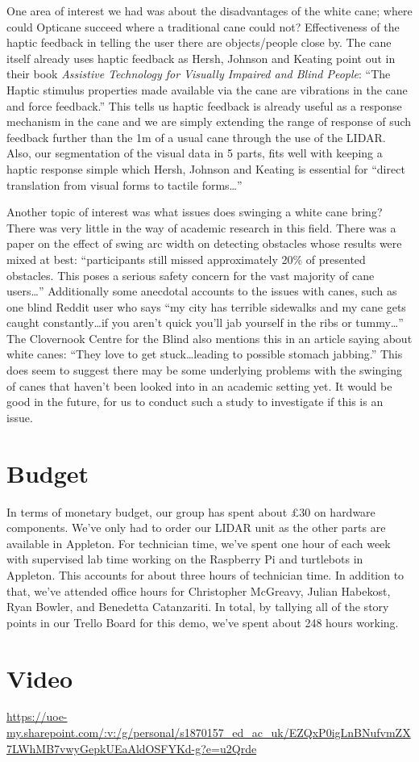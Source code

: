 \documentclass{article}
\begin{document}
One area of interest we had was about the disadvantages of the white cane; where could Opticane succeed where a traditional cane could not? 
Effectiveness of the haptic feedback in telling the user there are objects/people close by. The cane itself already uses haptic feedback as Hersh, Johnson and Keating point out in their book \textit{Assistive Technology for Visually Impaired and Blind People}: “The Haptic stimulus properties made available via the cane are vibrations in the cane and force feedback.” This tells us haptic feedback is already useful as a response mechanism in the cane and we are simply extending the range of response of such feedback further than the 1m of a usual cane through the use of the LIDAR. Also, our segmentation of the visual data in 5 parts, fits well with keeping a haptic response simple which Hersh, Johnson and Keating is essential for “direct translation from visual forms to tactile forms\dots” \cite{hershJohnsonKeating2008}

Another topic of interest was what issues does swinging a white cane bring?
There was very little in the way of academic research in this field. There was a paper on the effect of swing arc width on detecting obstacles whose results were mixed at best: “participants still missed approximately 20\% of presented obstacles. This poses a serious safety concern for the vast majority of cane users\dots” \cite{kimEmersonNaghshineh2017} Additionally some anecdotal accounts to the issues with canes, such as one blind Reddit user who says “my city has terrible sidewalks and my cane gets caught constantly\dots if you aren’t quick you’ll jab yourself in the ribs or tummy\dots” \cite{reddit2021} The Clovernook Centre for the Blind also mentions this in an article saying about white canes: “They love to get stuck…leading to possible stomach jabbing.” \cite{clovernook2020} This does seem to suggest there may be some underlying problems with the swinging of canes that haven’t been looked into in an academic setting yet. It would be good in the future, for us to conduct such a study to investigate if this is an issue.

\section{Budget}
In terms of monetary budget, our group has spent about £30 on hardware components. We've only had to order our LIDAR unit as the other parts are available in Appleton. For technician time, we've spent one hour of each week with supervised lab time working on the Raspberry Pi and turtlebots in Appleton. This accounts for about three hours of technician time. In addition to that, we've attended office hours for Christopher McGreavy, Julian Habekost, Ryan Bowler, and Benedetta Catanzariti. In total, by tallying all of the story points in our Trello Board for this demo, we've spent about 248 hours working.

\section{Video}
\url{https://uoe-my.sharepoint.com/:v:/g/personal/s1870157_ed_ac_uk/EZQxP0igLnBNufvmZX7LWhMB7vwyGepkUEaAldOSFYKd-g?e=u2Qrde}




\end{document}
